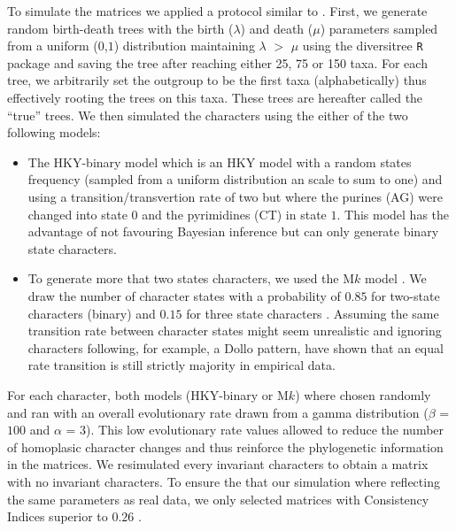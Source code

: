 \documentclass[12pt,letterpaper]{article}
\begin{document}
To simulate the matrices we applied a protocol similar to \citep{Guillerme2016146}.
First, we generate random birth-death trees with the birth ($\lambda$) and death ($\mu$) parameters sampled from a uniform ($0$,$1$) distribution maintaining $\lambda$ $>$ $\mu$ using the diversitree \texttt{R} package \citep[v0.9-8;][]{fitzjohndiversitree2012} and saving the tree after reaching either 25, 75 or 150 taxa.
For each tree, we arbitrarily set the outgroup to be the first taxa (alphabetically) thus effectively rooting the trees on this taxa.
These trees are hereafter called the ``true'' trees.
We then simulated the characters using the either of the two following models:
\begin{itemize}
    \item The HKY-binary model \citep{OReilly20160081} which is an HKY model \citep{HKY85} with a random states frequency (sampled from a uniform distribution an scale to sum to one) and using a transition/transvertion rate of two \citep{douadycomparison2003} but where the purines (AG) were changed into state $0$ and the pyrimidines (CT) in state $1$.
    This model has the advantage of not favouring Bayesian inference \citep[since it doesn't use a M$k$ model;][]{OReilly20160081} but can only generate binary state characters.
    \item To generate more that two states characters, we used the M$k$ model \citep{lewisa2001}.
    We draw the number of character states with a probability of $0.85$ for two-state characters (binary) and $0.15$ for three state characters \citep{Guillerme2016146}.
    Assuming the same transition rate between character states might seem unrealistic and ignoring characters following, for example, a Dollo pattern, \cite{Wright01072016} have shown that an equal rate transition is still strictly majority in empirical data.
\end{itemize}

For each character, both models (HKY-binary or M$k$) where chosen randomly and ran with an overall evolutionary rate drawn from a gamma distribution ($\beta$ = $100$ and $\alpha$ = $3$).
This low evolutionary rate values allowed to reduce the number of homoplasic character changes and thus reinforce the phylogenetic information in the matrices.
We resimulated every invariant characters to obtain a matrix with no invariant characters.
To ensure the that our simulation where reflecting the same parameters as real data, we only selected matrices with Consistency Indices superior to $0.26$ \citep{OReilly20160081}.
\end{document}
